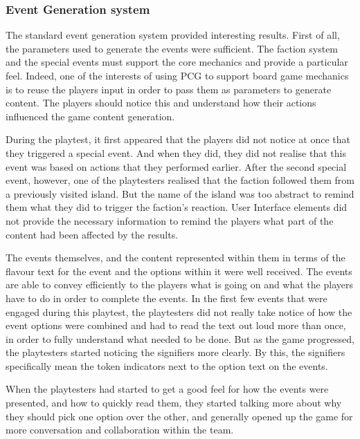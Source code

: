 \subsubsection{Event Generation system}
The standard event generation system provided interesting results. First of all, the parameters used to generate the events were sufficient.
The faction system and the special events must support the core mechanics and provide a particular feel. Indeed, one of the interests of using PCG to support board game mechanics is to reuse the players input in order to pass them as parameters to generate content. The players should notice this and understand how their actions influenced the game content generation. 

During the playtest, it first appeared that the players did not notice at once that they triggered a special event. And when they did, they did not realise that this event was based on actions that they performed earlier. After the second special event, however, one of the playtesters realised that the faction followed them from a previously visited island. But the name of the island was too abstract to remind them what they did to trigger the faction's reaction. User Interface elements did not provide the necessary information to remind the players what part of the content had been affected by the results. 

The events themselves, and the content represented within them in terms of the flavour text for the event and the options within it were well received. The events are able to convey efficiently to the players what is going on and what the players have to do in order to complete the events. 
In the first few events that were engaged during this playtest, the playtesters did not really take notice of how the event options were combined and had to read the text out loud more than once, in order to fully understand what needed to be done. But as the game progressed, the playtesters started noticing the signifiers more clearly. By this, the signifiers specifically mean the token indicators next to the option text on the events.

When the playtesters had started to get a good feel for how the events were presented, and how to quickly read them, they started talking more about why they should pick one option over the other, and generally opened up the game for more conversation and collaboration within the team.

